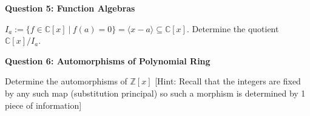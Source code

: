 \documentclass[11pt,twoside, a4paper]{report}
\theoremstyle{plain}
\theoremstyle{definition}
\begin{document}
\begin{center}
{\bf Question 5: Function Algebras}
\end{center}

$I_{a}:= \{ f \in \mathbb{C}[x] \ | \ f(a) = 0 \} = \langle x-a \rangle \subseteq \mathbb{C}[x]$. Determine the quotient $\mathbb{C}[x]/I_{a}$.

\begin{center}
{\bf Question 6: Automorphisms of Polynomial Ring}
\end{center}

Determine the automorphisms of $\mathbb{Z}[x]$ [Hint: Recall that the integers are fixed by any such map (substitution principal) so such a morphism is determined by 1 piece of information] 
\end{document}
